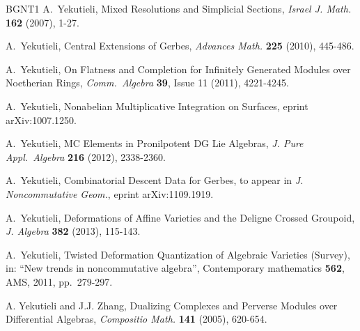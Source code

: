 \documentclass[a4paper, 10pt]{amsart}
\theoremstyle{definition}
\numberwithin{equation}{section}
\begin{document}
\begin{thebibliography}{BGNT1}
 A.\ Yekutieli, 
	Mixed Resolutions and Simplicial Sections,
	{\em Israel J. Math.} {\bf 162} (2007), 1-27.

 A.\ Yekutieli, 
	Central Extensions of Gerbes,
	{\em Advances Math.}  {\bf 225} (2010), 445-486.

 A.\ Yekutieli, 
	On Flatness and Completion for Infinitely Generated Modules
	over Noetherian Rings, 
{\em Comm.\ Algebra} {\bf 39}, Issue 11 (2011), 4221-4245.

 A.\ Yekutieli, 
	Nonabelian Multiplicative Integration on Surfaces, 
	eprint arXiv:1007.1250.

 A.\ Yekutieli,
	MC Elements in Pronilpotent DG Lie Algebras,
{\em J. Pure Appl.\ Algebra} {\bf 216} (2012),  2338-2360.

 A.\ Yekutieli,
	Combinatorial Descent Data for Gerbes, 
to appear in {\em J. Noncommutative Geom.}, eprint arXiv:1109.1919.

 A.\ Yekutieli, 
Deformations of Affine Varieties and the Deligne Crossed Groupoid,
{\em J. Algebra} {\bf 382} (2013), 115-143.

 A.\ Yekutieli, 
Twisted Deformation Quantization of Algebraic Varieties (Survey), 
in: ``New trends in noncommutative algebra'',
Contemporary mathematics {\bf 562}, AMS, 2011, pp.\ 279-297. 

 A. Yekutieli and J.J. Zhang,
	Dualizing Complexes and Perverse Modules over Differential Algebras,
	{\em Compositio Math.} {\bf 141} (2005), 620-654.

\end{thebibliography}
\end{document}
